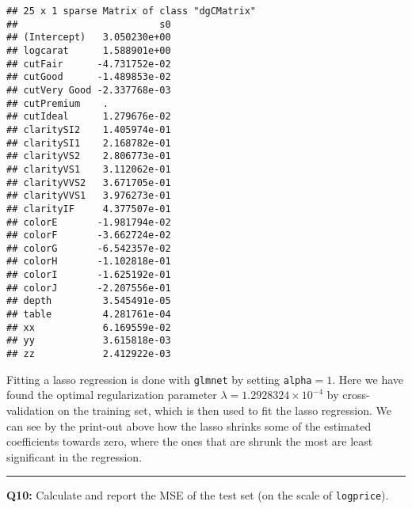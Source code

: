 \documentclass[]{article}
\newenvironment{Shaded}{\begin{snugshade}}{\end{snugshade}}
\newcommand{\KeywordTok}[1]{\textcolor[rgb]{0.13,0.29,0.53}{\textbf{#1}}}
\newcommand{\DataTypeTok}[1]{\textcolor[rgb]{0.13,0.29,0.53}{#1}}
\newcommand{\DecValTok}[1]{\textcolor[rgb]{0.00,0.00,0.81}{#1}}
\newcommand{\StringTok}[1]{\textcolor[rgb]{0.31,0.60,0.02}{#1}}
\newcommand{\OperatorTok}[1]{\textcolor[rgb]{0.81,0.36,0.00}{\textbf{#1}}}
\newcommand{\NormalTok}[1]{#1}
\begin{document}
\begin{verbatim}
## 25 x 1 sparse Matrix of class "dgCMatrix"
##                         s0
## (Intercept)   3.050230e+00
## logcarat      1.588901e+00
## cutFair      -4.731752e-02
## cutGood      -1.489853e-02
## cutVery Good -2.337768e-03
## cutPremium    .           
## cutIdeal      1.279676e-02
## claritySI2    1.405974e-01
## claritySI1    2.168782e-01
## clarityVS2    2.806773e-01
## clarityVS1    3.112062e-01
## clarityVVS2   3.671705e-01
## clarityVVS1   3.976273e-01
## clarityIF     4.377507e-01
## colorE       -1.981794e-02
## colorF       -3.662724e-02
## colorG       -6.542357e-02
## colorH       -1.102818e-01
## colorI       -1.625192e-01
## colorJ       -2.207556e-01
## depth         3.545491e-05
## table         4.281761e-04
## xx            6.169559e-02
## yy            3.615818e-03
## zz            2.412922e-03
\end{verbatim}

Fitting a lasso regression is done with \texttt{glmnet} by setting
\texttt{alpha}\(=1\). Here we have found the optimal regularization
parameter \(\lambda = 1.2928324\times 10^{-4}\) by cross-validation on
the training set, which is then used to fit the lasso regression. We can
see by the print-out above how the lasso shrinks some of the estimated
coefficients towards zero, where the ones that are shrunk the most are
least significant in the regression.

\begin{center}\rule{0.5\linewidth}{\linethickness}\end{center}

\textbf{Q10:} Calculate and report the MSE of the test set (on the scale
of \texttt{logprice}).

\begin{Shaded}
\end{Shaded}
\end{document}
